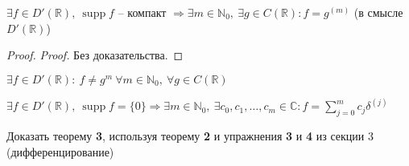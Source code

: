 \begin{enumerate}
  \begin{theorem}

  \(\exists  f  \in  D'(\mathbb{R} ),  \  \operatorname{supp} f\) --
  компакт
  \(\Rightarrow   \exists  m  \in  \mathbb{N} _0,  \  \exists  g  \in  C(\mathbb{R} ): f  = g^{(m)}\)
  (в смысле \(D'(\mathbb{R} )\))

  \begin{proof}

  \emph{Proof.} Без доказательства.

  \end{proof}

  \end{theorem}

  \begin{exercise}

  \(\exists  f  \in  D'(\mathbb{R} ):  \ f  \neq  g^{m}  \  \forall  m  \in  \mathbb{N} _0,  \  \forall  g  \in  C(\mathbb{R} )\)

  \end{exercise}

  \begin{theorem}

  \(\exists  f  \in  D'(\mathbb{R} ),  \  \operatorname{supp} f  =  \{0\}  \Rightarrow   \exists  m  \in  \mathbb{N} _0,  \  \exists  c_0, c_1,  \dots , c_m  \in  \mathbb{C} : f  =  \sum \limits_{j  =0}^m c_j \delta ^{(j)}\)

  \begin{exercise}

  Доказать теорему \textbf{3}, используя теорему \textbf{2} и упражнения
  \textbf{3} и \textbf{4} из секции 3 (дифференцирование)

  \end{exercise}

  \end{theorem}
\end{enumerate}
